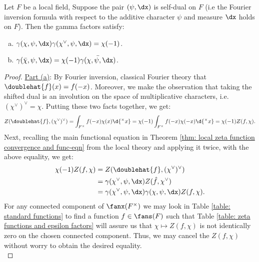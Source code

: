 \documentclass[11pt, x11names, openany]{book}
\begin{document}
\begin{prop}
    \label{prop: gamma factors relationship}
    Let $F$ be a local field, Suppose the pair $(\psi, \dx)$ is self-dual on $F$ (i.e the Fourier inversion formula with respect to the additive character $\psi$ and measure $\dx$ holds on $F$). Then the gamma factors satisfy:
    \begin{enumerate}[(a)]
        \item $\gamma(\chi, \psi, \dx) \gamma(\chi^\lor, \psi, \dx) = \chi(-1)$.
        \item $\gamma(\bar{\chi}, \psi, \dx) = \chi(-1) \bar{\gamma(\chi, \psi, \dx)}$.
    \end{enumerate}
    \end{prop}
    \begin{proof}
    \underline{Part (a)}: By Fourier inversion, classical Fourier theory that \ $\doublehat{f}(x) = f(-x)$. Moreover, we make the observation that taking the shifted dual is an involution on the space of multiplicative characters, i.e.  $(\chi^\lor)^\lor = \chi$. Putting these two facts together, we get:
    \begin{align*}
        Z(\doublehat{f}, (\chi^\lor)^\lor) = \int_{F^\times} f(-x)\chi(x)\d{^\times x} = \chi(-1)  \int_{F^\times} f(-x)\chi(-x)\d{^\times x} = \chi(-1) Z(f, \chi).
    \end{align*} 
    Next, recalling the main functional equation in Theorem \ref{thm: local zeta function convergence and func-eqn} from the local theory and applying it twice, with the above equality, we get:
    \begin{align*}
        \chi(-1) Z(f, \chi) &= Z(\doublehat{f}, (\chi^\lor)^\lor)\\
        &= \gamma(\chi^\lor, \psi, \dx) Z(\hat{f}, \chi^\lor)\\
        &= \gamma(\chi^\lor, \psi, \dx) \gamma(\chi, \psi, \dx) Z(f, \chi). 
    \end{align*}
    For any connected component of $\fanx(F^\times)$ we may look in Table \ref{table: standard functions} to find a function $f \in \fans(F)$ such that Table \ref{table: zeta functions and epsilon factors} will assure us that $\chi \mapsto Z(f, \chi)$ is not identically zero on the chosen connected component. Thus, we may cancel the $Z(f, \chi)$ without worry to obtain the desired equality.\\
    

\end{proof}
\end{document}
